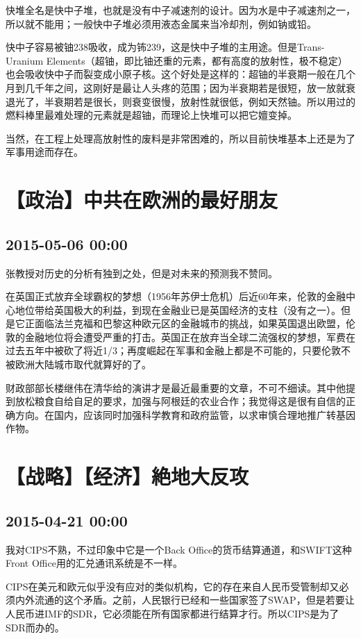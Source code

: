 \documentclass[twocolumn]{ctexart}
\begin{document}
快堆全名是快中子堆，也就是没有中子减速剂的设计。因为水是中子减速剂之一，所以就不能用；一般快中子堆必须用液态金属来当冷却剂，例如钠或铅。

快中子容易被铀238吸收，成为钸239，这是快中子堆的主用途。但是Trans-Uranium Elements（超铀，即比铀还重的元素，都有高度的放射性，极不稳定）也会吸收快中子而裂变成小原子核。这个好处是这样的：超铀的半衰期一般在几个月到几千年之间，这刚好是最让人头疼的范围；因为半衰期若是很短，放一放就衰退光了，半衰期若是很长，则衰变很慢，放射性就很低，例如天然铀。所以用过的燃料棒里最难处理的元素就是超铀，而理论上快堆可以把它嬗变掉。

当然，在工程上处理高放射性的废料是非常困难的，所以目前快堆基本上还是为了军事用途而存在。\section*{【政治】中共在欧洲的最好朋友}
\subsection*{2015-05-06 00:00}
张教授对历史的分析有独到之处，但是对未来的预测我不赞同。

在英国正式放弃全球霸权的梦想（1956年苏伊士危机）后近60年来，伦敦的金融中心地位带给英国极大的利益，到现在金融业已是英国经济的支柱（没有之一）。但是它正面临法兰克福和巴黎这种欧元区的金融城市的挑战，如果英国退出欧盟，伦敦的金融地位将会遭受严重的打击。英国正在放弃当全球二流强权的梦想，军费在过去五年中被砍了将近1/3；再度崛起在军事和金融上都是不可能的，只要伦敦不被欧洲大陆城市取代就算好的了。

财政部部长楼继伟在清华给的演讲才是最近最重要的文章，不可不细读。其中他提到放松粮食自给自足的要求，加强与阿根廷的农业合作；我觉得这是很有自信的正确方向。在国内，应该同时加强科学教育和政府监管，以求审慎合理地推广转基因作物。
\section*{【战略】【经济】絶地大反攻}
\subsection*{2015-04-21 00:00}
我对CIPS不熟，不过印象中它是一个Back Office的货币结算通道，和SWIFT这种Front Office用的汇兑通讯系统是不一样。

CIPS在美元和欧元似乎没有应对的类似机构，它的存在来自人民币受管制却又必须内外流通的这个矛盾。之前，人民银行已经和一些国家签了SWAP，但是若要让人民币进IMF的SDR，它必须能在所有国家都进行结算才行。所以CIPS是为了SDR而办的。
\end{document}
